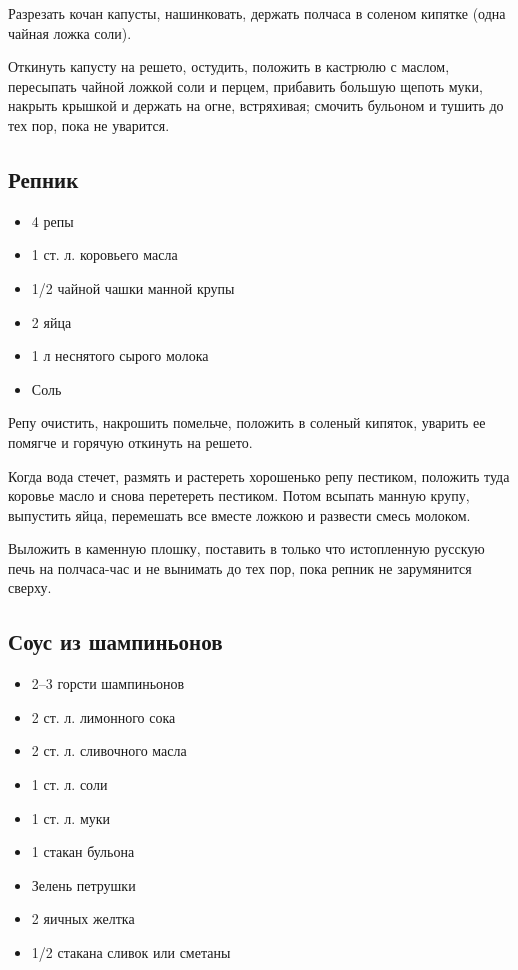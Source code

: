 Разрезать кочан капусты, нашинковать, держать полчаса в соленом кипятке (одна чайная ложка соли).

Откинуть капусту на решето, остудить, положить в кастрюлю с маслом, пересыпать чайной ложкой соли и перцем, прибавить большую щепоть муки, накрыть крышкой и держать на огне, встряхивая; смочить бульоном и тушить до тех пор, пока не уварится.

\subsection{Репник}

\begin{itemize}
	\item 4 репы 
    \item 1 ст. л. коровьего масла 
    \item 1/2 чайной чашки манной крупы 
    \item 2 яйца 
    \item 1 л неснятого сырого молока 
    \item Соль
\end{itemize}

Репу очистить, накрошить помельче, положить в соленый кипяток, уварить ее помягче и горячую откинуть на решето.

Когда вода стечет, размять и растереть хорошенько репу пестиком, положить туда коровье масло и снова перетереть пестиком. Потом всыпать манную крупу, выпустить яйца, перемешать все вместе ложкою и развести смесь молоком.

Выложить в каменную плошку, поставить в только что истопленную русскую печь на полчаса-час и не вынимать до тех пор, пока репник не зарумянится сверху.

\subsection{Соус из шампиньонов}

\begin{itemize}
	\item 2–3 горсти шампиньонов 
    \item 2 ст. л. лимонного сока 
    \item 2 ст. л. сливочного масла 
    \item 1 ст. л. соли 
    \item 1 ст. л. муки 
    \item 1 стакан бульона 
    \item Зелень петрушки 
    \item 2 яичных желтка 
    \item 1/2 стакана сливок или сметаны
\end{itemize}

